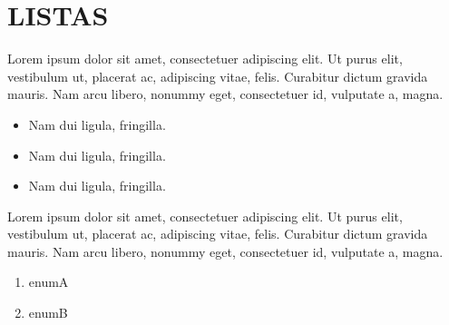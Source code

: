 \section {LISTAS}
 Lorem ipsum dolor sit amet, consectetuer adipiscing elit. Ut purus elit, vestibulum ut, placerat ac, adipiscing vitae, felis. Curabitur dictum gravida mauris. Nam arcu libero, nonummy eget, consectetuer id, vulputate a, magna.

\begin{itemize}
\item Nam dui ligula, fringilla.
\item Nam dui ligula, fringilla.
\item Nam dui ligula, fringilla.
\end{itemize}

Lorem ipsum dolor sit amet, consectetuer adipiscing elit. Ut purus elit, vestibulum ut, placerat ac, adipiscing vitae, felis. Curabitur dictum gravida mauris. Nam arcu libero, nonummy eget, consectetuer id, vulputate a, magna.

\begin{enumerate}
 \item enumA
 \item enumB
\end{enumerate}